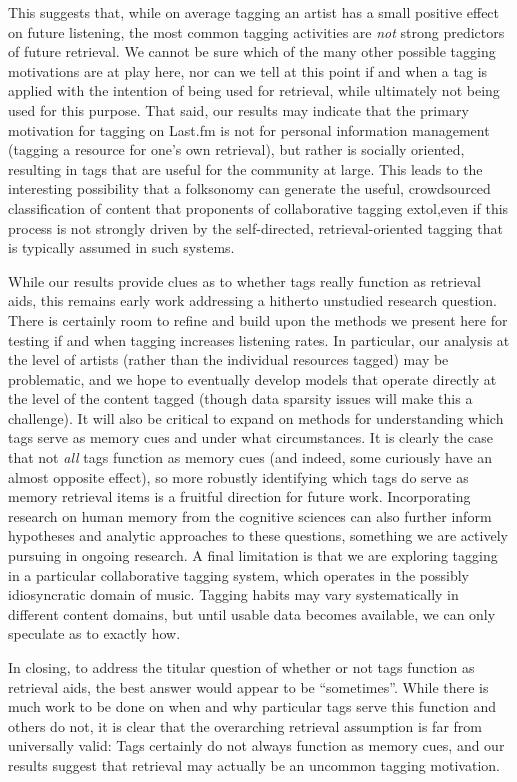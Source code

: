 This suggests that, while on average tagging an artist  has a small positive effect on future listening, the most common tagging activities are \emph{not} strong predictors of future retrieval. We cannot be sure which of the many other possible tagging motivations are at play here, nor can we tell at this point if and when a tag is applied with the intention of being used for retrieval, while ultimately not being used for this purpose. That said, our results may indicate that the primary motivation for tagging on Last.fm is not for personal information management (tagging a resource for one's own retrieval), but rather is socially oriented, resulting in tags that are useful for the community at large. This leads to the interesting possibility that a folksonomy can generate the useful, crowdsourced classification of content that proponents of collaborative tagging extol,even if this process is not strongly driven by the self-directed, retrieval-oriented tagging that is typically assumed in such systems.

While our results provide clues as to whether tags really function as retrieval aids, this remains early work addressing a hitherto unstudied research question. There is certainly room to refine and build upon the methods we present here for testing if and when tagging increases listening rates. In particular, our analysis at the level of artists (rather than the individual resources tagged) may be problematic, and we hope to eventually develop models that operate directly at the level of the content tagged (though data sparsity issues will make this a challenge). It will also be critical to expand on methods for understanding which tags serve as memory cues and under what circumstances. It is clearly the case that not \emph{all} tags function as memory cues (and indeed, some curiously have an almost opposite effect), so more robustly identifying which tags do serve as memory retrieval items is a fruitful direction for future work. Incorporating research on human memory from the cognitive sciences can also further inform hypotheses and analytic approaches to these questions, something we are actively pursuing in ongoing research. A final limitation is that we are exploring tagging in a particular collaborative tagging system, which operates in the possibly idiosyncratic domain of music. Tagging habits may vary systematically in different content domains, but until usable data becomes available, we can only speculate as to exactly how.

In closing, to address the titular question of whether or not tags function as retrieval aids, the best answer would appear to be ``sometimes''. While there is much work to be done on when and why particular tags serve this function and others do not, it is clear that the overarching retrieval assumption is far from universally valid: Tags certainly do not always function as memory cues, and our results suggest that retrieval may actually be an uncommon tagging motivation.

